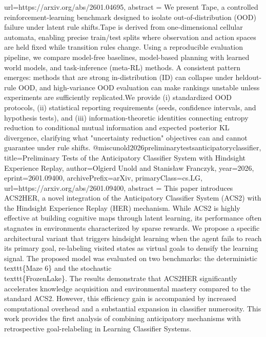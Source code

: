 {      url={https://arxiv.org/abs/2601.04695},
      abstract = {We present Tape, a controlled reinforcement-learning benchmark designed to isolate out-of-distribution (OOD) failure under latent rule shifts.Tape is derived from one-dimensional cellular automata, enabling precise train/test splits where observation and action spaces are held fixed while transition rules change. Using a reproducible evaluation pipeline, we compare model-free baselines, model-based planning with learned world models, and task-inference (meta-RL) methods. A consistent pattern emerges: methods that are strong in-distribution (ID) can collapse under heldout-rule OOD, and high-variance OOD evaluation can make rankings unstable unless experiments are sufficiently replicated.We provide (i) standardized OOD protocols, (ii) statistical reporting requirements (seeds, confidence intervals, and hypothesis tests), and (iii) information-theoretic identities connecting entropy reduction to conditional mutual information and expected posterior KL divergence, clarifying what "uncertainty reduction" objectives can and cannot guarantee under rule shifts.}
}@misc{unold2026preliminarytestsanticipatoryclassifier,
      title={Preliminary Tests of the Anticipatory Classifier System with Hindsight Experience Replay}, 
      author={Olgierd Unold and Stanisław Franczyk},
      year={2026},
      eprint={2601.09400},
      archivePrefix={arXiv},
      primaryClass={cs.LG},
      url={https://arxiv.org/abs/2601.09400},
      abstract = {This paper introduces ACS2HER, a novel integration of the Anticipatory Classifier System (ACS2) with the Hindsight Experience Replay (HER) mechanism. While ACS2 is highly effective at building cognitive maps through latent learning, its performance often stagnates in environments characterized by sparse rewards. We propose a specific architectural variant that triggers hindsight learning when the agent fails to reach its primary goal, re-labeling visited states as virtual goals to densify the learning signal. The proposed model was evaluated on two benchmarks: the deterministic \\texttt\{Maze 6\} and the stochastic \\texttt\{FrozenLake\}. The results demonstrate that ACS2HER significantly accelerates knowledge acquisition and environmental mastery compared to the standard ACS2. However, this efficiency gain is accompanied by increased computational overhead and a substantial expansion in classifier numerosity. This work provides the first analysis of combining anticipatory mechanisms with retrospective goal-relabeling in Learning Classifier Systems.}
}
